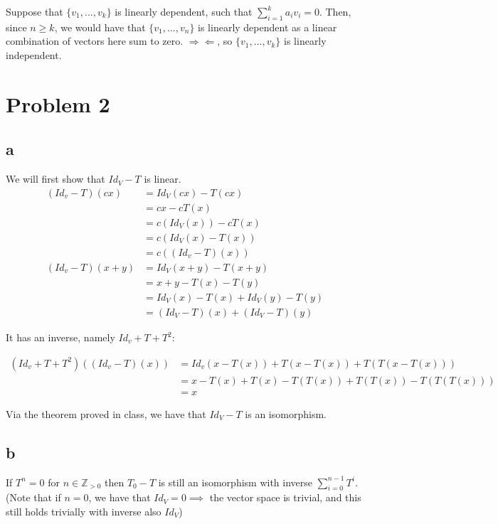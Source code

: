 \documentclass[12pt,letterpaper]{article}
\theoremstyle{definition}
\newcommand{\contra}{\Rightarrow\!\Leftarrow}
\newcommand{\Zg}{\mathbb{Z}_{>0}}
\begin{document}
Suppose that $\{v_1, ..., v_k\}$ is linearly dependent, such that
$\sum_{i=1}^ka_iv_i = 0$. Then, since $n \geq k$, we would have that $\{v_1,
..., v_n\}$ is linearly dependent as a linear combination of vectors here sum to
zero. $\contra$, so $\{v_1, ..., v_k\}$ is linearly independent.


\section*{Problem 2}

\subsection*{a}

We will first show that $Id_V - T$ is linear.
\begin{align*}
  (Id_v-T)(cx) &= Id_V(cx) - T(cx) \\
               &= cx - cT(x) \\
               &= c(Id_V(x)) - cT(x) \\
               &= c(Id_V(x) - T(x)) \\
               &= c((Id_v - T)(x)) \\
  (Id_v - T)(x + y) &= Id_V(x + y) - T(x + y) \\
               &= x + y - T(x) - T(y) \\
               &= Id_V(x) - T(x) + Id_V(y) - T(y) \\
               &= (Id_V - T)(x) + (Id_V - T)(y)
\end{align*}

It has an inverse, namely $Id_v + T + T^2$:

\begin{align*}
  (Id_v + T + T^2)((Id_v - T)(x)) &= Id_v(x - T(x)) + T(x - T(x)) + T(T(x - T(x))) \\
                                  &= x - T(x) + T(x) - T(T(x)) + T(T(x)) - T(T(T(x))) \\
                                  &= x
\end{align*}

Via the theorem proved in class, we have that $Id_V - T$ is an isomorphism.

\subsection*{b}

If $T^n = 0$ for $n \in \Zg$ then $T_0 - T$ is still an isomorphism with inverse
$\sum_{i=0}^{n-1}T^i$. (Note that if $n = 0$, we have that $Id_V = 0 \implies$
the vector space is trivial, and this still holds trivially with inverse also $Id_V$)
\end{document}
